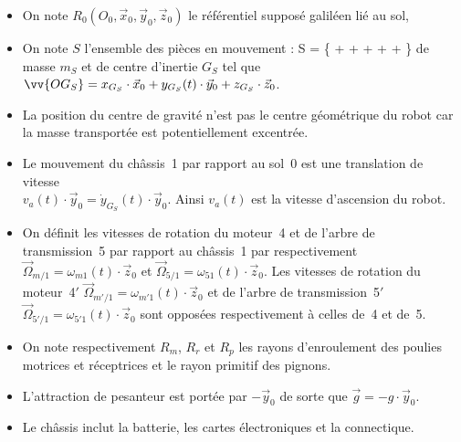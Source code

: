 \begin{itemize}
  \item On note $R_0(O_0,\vec{x}_0,\vec{y}_0,\vec{z}_0)$ le référentiel supposé galiléen lié au sol,
  \item On note $S$ l'ensemble des pièces en mouvement : S = \{ +  \linebreak +  +  +  + \} de masse $m_S$ et de centre d'inertie $G_S$ tel que $\vv{OG_S} = x_{G_S}\cdot\vec{x}_0 + y_{G_S}(t)\cdot\vec{y}_0 + z_{G_S}\cdot\vec{z}_0$.
  \item La position du centre de gravité n'est pas le centre géométrique du robot car la masse transportée est potentiellement excentrée.
  \item Le mouvement du châssis~1 par rapport au sol~0 est une translation de vitesse \\ $v_a(t)\cdot\vec{y}_0=\dot{y}_{G_S}(t)\cdot\vec{y}_0$.
    Ainsi $v_a(t)$ est la vitesse d'ascension du robot.
  \item On définit les vitesses de rotation du moteur~4 et de l'arbre de transmission~5 par rapport au
    châssis~1 par respectivement $\vec{\Omega}_{m/1} = \omega_{m1}(t)\cdot\vec{z}_0$ et $\vec{\Omega}_{5/1} = \omega_{51}(t)\cdot\vec{z}_0$. Les vitesses de rotation du
    moteur~4$'$ $\vec{\Omega}_{m'/1} = \omega_{m'1}(t)\cdot\vec{z}_0$ et de l'arbre de transmission~5$'$ $\vec{\Omega}_{5'/1} = \omega_{5'1}(t)\cdot\vec{z}_0$ sont opposées respectivement à celles de~4 et de~5.
  \item On note respectivement $R_m$, $R_r$ et $R_p$ les rayons d'enroulement des poulies motrices et réceptrices et le rayon primitif des pignons.
  \item L'attraction de pesanteur est portée par $-\vec{y}_0$ de sorte que $\vec{g} = -g\cdot\vec{y}_0$.
  \item Le châssis inclut la batterie, les cartes électroniques et la connectique.
\end{itemize}

